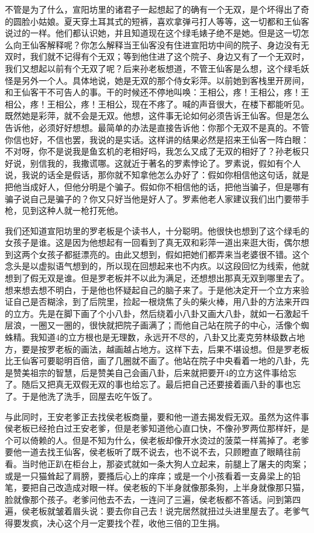 不管是为了什么，宣阳坊里的诸君子一起想起了的确有一个无双，是个坏得出了奇的圆脸小姑娘。夏天穿土耳其式的短裤，喜欢拿弹弓打人等等，这一切都和王仙客说过的一样。他们都认识她，并且知道现在这个绿毛婊子绝不是她。但是这一切怎么向王仙客解释呢？你怎么解释当王仙客没有住进宣阳坊中间的院子、身边没有无双时，我们就不记得有个无双；等到他住进了这个院子、身边又有了一个无双时，我们又想起以前有个无双了呢？后来孙老板想道，不管王仙客是么想，这个绿毛妖怪是另外一个人。具体地说，她是无双的那个侍女彩萍。以前她到客栈里开房间，和王仙客干不可告人的事。干的时候还不停地叫唤：王相公，疼！王相公，疼！王相公，疼！王相公，疼！王相公，现在不疼了。喊的声音很大，在楼下都能听见。既然她是彩萍，就不会是无双。他想，这件事无论如何必须告诉王仙客。但是怎么告诉他，必须好好想想。最简单的办法是直接告诉他：你那个无双不是真的。不管你信也好，不信也罢，我说的是实话。这样讲的结果必然是招来王仙客一阵白眼：不对呀，你不是说我是鱼玄机的老相好吗，我怎么又成了无双的相好了？孙老板只好说，别信我的，我撒谎哪。这就近于著名的罗素悖论了。罗素说，假如有个人说，我说的话全是假话，那你就不知拿他怎么办好了：假如你相信他这句话，就是把他当成好人，但他分明是个骗子。假如你不相信他的话，把他当骗子，但是哪有骗子说自己是骗子的？你又只好当他是好人了。罗素他老人家建议我们出门要带手枪，见到这种人就一枪打死他。 

我们还知道宣阳坊里的罗老板是个读书人，十分聪明。他很快也想到了这个绿毛的女孩子是谁。这是因为他想起有一回看到了真无双和彩萍一道出来逛大街，偶尔想到这两个女孩子都挺漂亮的。由此又想到，假如把她们都弄来当老婆很不错。这个念头是以虚拟语气想到的，所以现在回想起来也不内疚。以这段回忆为线索，他就想到了假无双是谁。但是罗老板并不以此为满足，还想想出那真无双到哪里去了。想来想去想不明白，于是他也怀疑起自己的脑子来了。于是他决定开一个立方来验证自己是否糊涂，到了后院里，捡起一根烧焦了头的柴火棒，用八卦的方法来开四的立方。先是在脚下画了个小八卦，然后绕着小八卦又画大八卦，就如一石激起千层浪，一圈又一圈的，很快就把院子画满了；而他自己站在院子的中心，活像个蜘蛛精。我知道4的立方根也是无理数，永远开不尽的，八卦又比麦克劳林级数占地方，要是按罗老板的画法，越画越占地方。这样下去，后果不堪设想。但是罗老板比王仙客可要聪明百倍，画了几圈就不画了。他站在院子中央看着一地的八卦，先是赞美祖宗的智慧，后是赞美自己会画八卦，后来就把要开4的立方这件事给忘了。随后又把真无双假无双的事也给忘了。最后把自己还要接着画八卦的事也忘了。于是他洗了洗手，回屋去吃午饭了。 

与此同时，王安老爹正去找侯老板商量，要和他一道去揭发假无双。虽然为这件事侯老板已经抢白过王安老爹，但是老爹知道他心直口快，不像孙罗两位那样奸，是个可以倚赖的人。但是不知为什么，侯老板却像开水烫过的菠菜一样蔫掉了。老爹要他一道去找王仙客，侯老板听了既不说去，也不说不去，只顾瞪直了眼睛往前看。当时他正趴在柜台上，那姿式就如一条大狗人立起来，前腿上了屠夫的肉案；或是一只猫耸起了肩膀，要搔后心上的痒痒；或是一个小孩看着一支鼻梁上的铅笔，要把自己改造成对眼一样。侯老板的下半身就像那条狗，上半身就像那只猫，脸就像那个孩子。老爹问他去不去，一连问了三遍，侯老板都不答话。问到第四遍，侯老板就皱着眉头说：要去你自己去！说完居然就扭过头进里屋去了。老爹气得要发疯，决心这个月一定要找个茬，收他三倍的卫生捐。 

